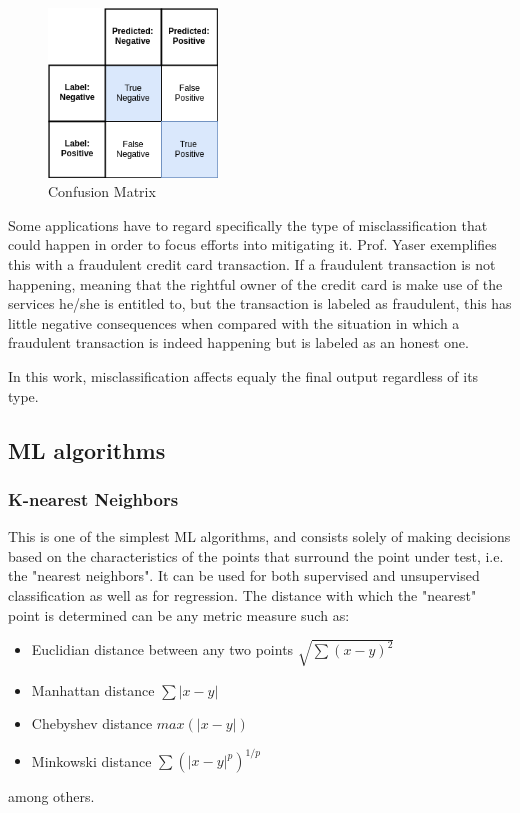 \begin{figure}[htb]
    \centering
      \includegraphics[width=0.4\textwidth]{figures/cm}
      \caption{Confusion Matrix}
      \label{fig:conf_matrix}
\end{figure}

Some applications have to regard specifically the type of misclassification that could happen in order to focus efforts into mitigating it. Prof. Yaser \cite{Yaser} exemplifies this with a fraudulent credit card transaction. If a fraudulent transaction is not happening, meaning that the rightful owner of the credit card is make use of the services he/she is entitled to, but the transaction is labeled as fraudulent, this has little negative consequences when compared with the situation in which a fraudulent transaction is indeed happening but is labeled as an honest one.

In this work, misclassification affects equaly the final output regardless of its type.
\subsection{\ac{ML} algorithms}\label{ch:ml_algs}
\subsubsection{K-nearest Neighbors}
This is one of the simplest \ac{ML} algorithms, and consists solely of making decisions based on the characteristics of the points that surround the point under test, i.e. the "nearest neighbors". It can be used for both supervised and unsupervised classification as well as for regression. The distance with which the "nearest" point is determined can be any metric measure such as:
\begin{itemize}
    \item Euclidian distance between any two points \( \sqrt{\sum (x - y)^2} \)
    \item Manhattan distance \( \sum {|x - y|} \)
    \item Chebyshev distance \( max(|x - y|) \)
    \item Minkowski distance \( \sum(|x - y|^p)^{1/p} \)
\end{itemize}
among others.

